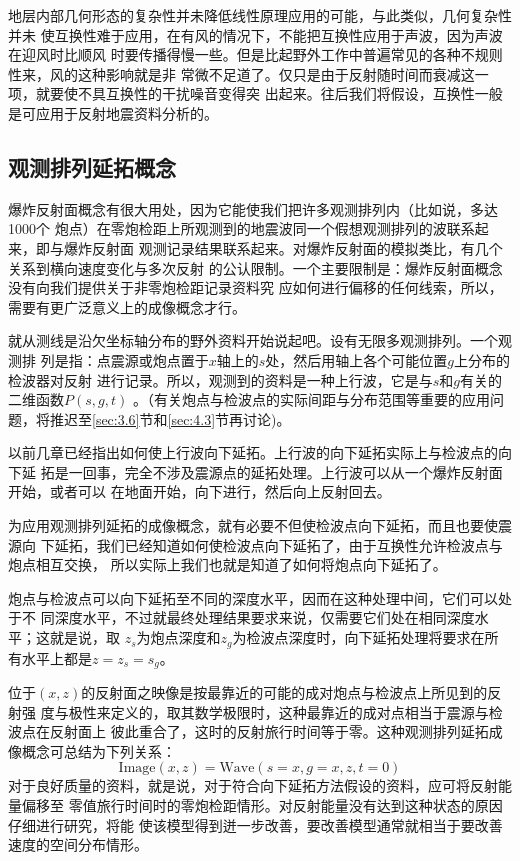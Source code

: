 地层内部几何形态的复杂性并未降低线性原理应用的可能，与此类似，几何复杂性并未
使互换性难于应用，在有风的情况下，不能把互换性应用于声波，因为声波在迎风时比顺风
时要传播得慢一些。但是比起野外工作中普遍常见的各种不规则性来，风的这种影响就是非
常微不足道了。仅只是由于反射随时间而衰减这一项，就要使不具互换性的干扰噪音变得突
出起来。往后我们将假设，互换性一般是可应用于反射地震资料分析的。

\subsection{观测排列延拓概念}
\label{sec:3.3.2}

爆炸反射面概念有很大用处，因为它能使我们把许多观测排列内（比如说，多达1000个
炮点）在零炮检距上所观测到的地震波同一个假想观测排列的波联系起来，即与爆炸反射面
观测记录结果联系起来。对爆炸反射面的模拟类比，有几个关系到横向速度变化与多次反射
的公认限制。一个主要限制是：爆炸反射面概念没有向我们提供关于非零炮检距记录资料究
应如何进行偏移的任何线索，所以，需要有更广泛意义上的成像概念才行。

就从测线是沿欠坐标轴分布的野外资料开始说起吧。设有无限多观测排列。一个观测排
列是指：点震源或炮点置于$x$轴上的$s$处，然后用轴上各个可能位置$g$上分布的检波器对反射
进行记录。所以，观测到的资料是一种上行波，它是与$s$和$g$有关的二维函数$P(s,g,t)$
。（有关炮点与检波点的实际间距与分布范围等重要的应用问题，将推迟至\ref{sec:3.6}节和\ref{sec:4.3}节再讨论)。

以前几章已经指出如何使上行波向下延拓。上行波的向下延拓实际上与检波点的向下延
拓是一回事，完全不涉及震源点的延拓处理。上行波可以从一个爆炸反射面开始，或者可以
在地面开始，向下进行，然后向上反射回去。

为应用观测排列延拓的成像概念，就有必要不但使检波点向下延拓，而且也要使震源向
下延拓，我们已经知道如何使检波点向下延拓了，由于互换性允许检波点与炮点相互交换，
所以实际上我们也就是知道了如何将炮点向下延拓了。

炮点与检波点可以向下延拓至不同的深度水平，因而在这种处理中间，它们可以处于不
同深度水平，不过就最终处理结果要求来说，仅需要它们处在相同深度水平；这就是说，取
$z_s$为炮点深度和$z_g$为检波点深度时，向下延拓处理将要求在所有水平上都是$z=z_s=s_g$。

位于$(x,z)$的反射面之映像是按最靠近的可能的成对炮点与检波点上所见到的反射强
度与极性来定义的，取其数学极限时，这种最靠近的成对点相当于震源与检波点在反射面上
彼此重合了，这时的反射旅行时间等于零。这种观测排列延拓成像概念可总结为下列关系：
\begin{equation}
\text{Image}(x,z)=\text{Wave}(s=x,g=x,z,t=0)
\label{eq:ex3.3.1}
\end{equation}
对于良好质量的资料，就是说，对于符合向下延拓方法假设的资料，应可将反射能量偏移至
零值旅行时间时的零炮检距情形。对反射能量没有达到这种状态的原因仔细进行研究，将能
使该模型得到迸一步改善，要改善模型通常就相当于要改善速度的空间分布情形。

